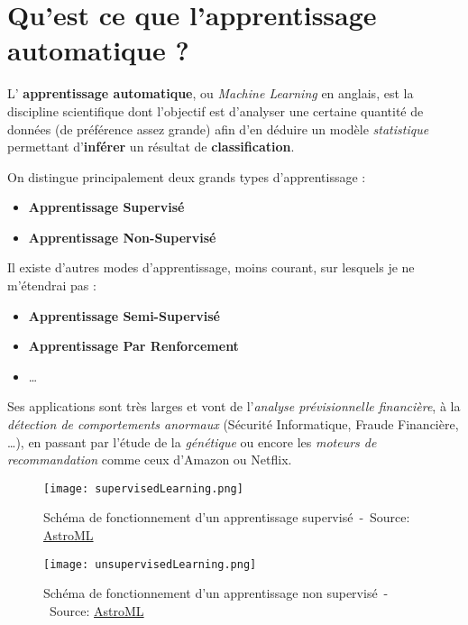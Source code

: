 \section{Qu'est ce que l'apprentissage automatique ?}

L' \textbf{apprentissage automatique}, ou \textit{Machine Learning} en anglais, est la discipline scientifique dont l'objectif est d'analyser une certaine quantité de données (de préférence assez grande) afin d'en déduire un modèle \textit{statistique} permettant d'\textbf{inférer} un résultat de \textbf{classification}.

On distingue principalement deux grands types d'apprentissage :
\begin{itemize}
	\item \textbf{Apprentissage Supervisé}
	\item \textbf{Apprentissage Non-Supervisé}
\end{itemize}
\vspace{3mm}

Il existe d'autres modes d'apprentissage, moins courant, sur lesquels je ne m'étendrai pas :
\begin{itemize}
	\item \textbf{Apprentissage Semi-Supervisé}
	\item \textbf{Apprentissage Par Renforcement}
	\item \ldots
\end{itemize}
\vspace{3mm}
 
Ses applications sont très larges et vont de l'\textit{analyse prévisionnelle financière}, à la \textit{détection de comportements anormaux} (Sécurité Informatique, Fraude Financière, \ldots), en passant par l'étude de la \textit{génétique} ou encore les \textit{moteurs de recommandation} comme ceux d'Amazon ou Netflix. 

 \begin{figure}[H]
    \centering
    \texttt{[image: supervisedLearning.png]}
	\caption{Schéma de fonctionnement d'un apprentissage supervisé~-~Source: \href{http://www.astroml.org/sklearn_tutorial/general_concepts.html\#supervised-learning-model-fit-x-y}{AstroML}}\label{image.supervisedLearning} 
\end{figure}

 \begin{figure}[H]
    \centering
    \texttt{[image: unsupervisedLearning.png]}
	\caption{Schéma de fonctionnement d'un apprentissage non supervisé~-~Source: \href{http://www.astroml.org/sklearn_tutorial/general_concepts.html\#unsupervised-learning-model-fit-x}{AstroML}}\label{image.unsupervisedLearning} 
\end{figure}


